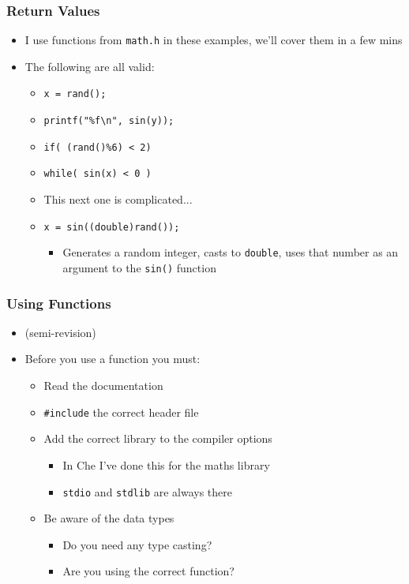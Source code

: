\documentclass[14pt]{beamer}
\begin{document}
\begin{frame}
\frametitle{Return Values}
\begin{itemize}
\item I use functions from \texttt{math.h} in these examples, we'll cover them in a few mins
\pause
\item The following are all valid:
	\begin{itemize}
		\item \texttt{x = rand();}
		\item \texttt{printf("\%f\textbackslash n", sin(y));}
		\item \texttt{if( (rand()\%6) < 2)}
		\item \texttt{while( sin(x) < 0 )}
		\pause
		\item This next one is complicated...
		\pause
		\item \texttt{x = sin((double)rand());}
			\begin{itemize}
			\pause
				\item Generates a random integer, casts to \texttt{double}, uses that number as an argument to the \texttt{sin()} function
			\end{itemize}
	\end{itemize}
\end{itemize}
\end{frame}

\begin{frame}
\frametitle{Using Functions}
\begin{itemize}
\item (semi-revision)
\item Before you use a function you must:
	\begin{itemize}
		\item Read the documentation
		\item \texttt{\#include} the correct header file
		\item Add the correct library to the compiler options
			\begin{itemize}
				\item In Che I've done this for the maths library
				\item \texttt{stdio} and \texttt{stdlib} are always there
			\end{itemize}
		\item Be aware of the data types
			\begin{itemize}
				\item Do you need any type casting?
				\item Are you using the correct function?
			\end{itemize}
	\end{itemize}
\end{itemize}
\end{frame}
\end{document}
